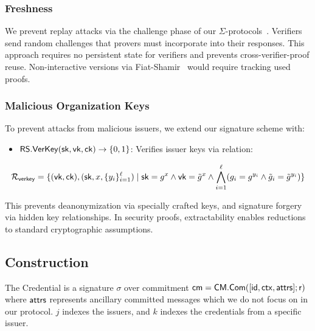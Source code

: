 \subsubsection{Freshness}
We prevent replay attacks via the challenge phase of our $\Sigma$-protocols~\cite{desmedt_proofs_1994, damgard_sigma_2010}. Verifiers send random challenges that provers must incorporate into their responses. This approach requires no persistent state for verifiers and prevents cross-verifier-proof reuse. Non-interactive versions via Fiat-Shamir~\cite{odlyzko_how_1986} would require tracking used proofs.

\subsubsection{Malicious Organization Keys}
To prevent attacks from malicious issuers, we extend our signature scheme with:
\begin{itemize}
    \item $\mathsf{RS.VerKey}(\mathsf{sk}, \mathsf{vk}, \mathsf{ck}) \to \{0,1\}$: Verifies issuer keys via relation:
\end{itemize}
\[
\mathcal{R}_{\mathsf{verkey}} = \{(\mathsf{vk}, \mathsf{ck}),(\mathsf{sk}, x, \{y_i\}_{i=1}^\ell) \mid \mathsf{sk} = g^x \wedge \mathsf{vk} = \tilde{g}^x \wedge \bigwedge_{i=1}^\ell (g_i = g^{y_i} \wedge \tilde{g}_i = \tilde{g}^{y_i})\}
\]

This prevents deanonymization via specially crafted keys, and signature forgery via hidden key relationships. In security proofs, extractability enables reductions to standard cryptographic assumptions.


\newpage
\subsection{\MIMCABC Construction}
The Credential is a signature $\sigma$ over commitment $\mathsf{cm} = \mathsf{CM.Com}([\mathsf{id}, \mathsf{ctx}, \mathsf{attrs}]; \mathsf{r})$ where $\mathsf{attrs}$ represents ancillary committed messages which we do not focus on in our protocol. $j$ indexes the issuers, and $k$ indexes the credentials from a specific issuer. 

